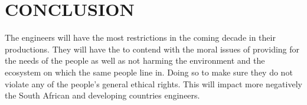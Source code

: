 \documentclass[12pt]{witseiepaper}
\begin{document}
\section{CONCLUSION}

The engineers will have the most restrictions in the coming decade in their productions. They will have the to contend with the moral issues of providing for the needs of the people as well as not harming the environment and the ecosystem on which the same people line in. Doing so to make sure they do not violate any of the people’s general ethical rights. This will impact more negatively the South African and developing countries engineers.


\nocite{*}


\end{document}
